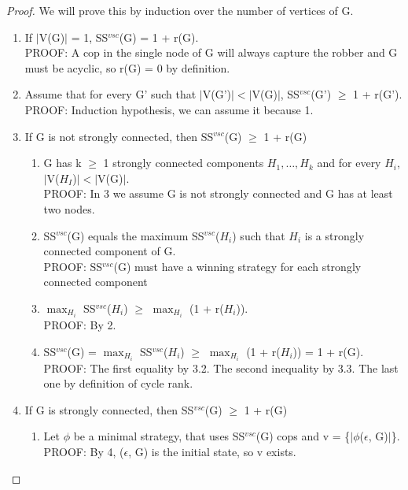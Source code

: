 \begin{proof}
We will prove this by induction over the number of vertices of G.
\begin{enumerate}
  \item If $|$V(G)$|$ = 1, SS$^{vsc}$(G) = 1 + r(G). \\
  PROOF: A cop in the single node of G will always capture the robber and G must be acyclic, so r(G) = 0 by definition.
  \item Assume that for every G' such that  $|$V(G')$| < |$V(G)$|$, SS$^{vsc}$(G') $\geq$ 1 + r(G'). \\
  PROOF: Induction hypothesis, we can assume it because 1.
  \item If G is not strongly connected, then SS$^{vsc}$(G) $\geq$ 1 + r(G)
  \begin{enumerate}[label*=\arabic*.]
    \item G has k $\geq$ 1 strongly connected components $H_1, \ldots, H_k$ and for every $H_i$, $|$V($H_I$)$| < |$V(G)$|$. \\
    PROOF: In 3 we assume G is not strongly connected and G has at least two nodes.
    
    \item SS$^{vsc}$(G) equals the maximum SS$^{vsc}$($H_i$) such that $H_i$ is a strongly connected component of G. \\
    PROOF: SS$^{vsc}$(G) must have a winning strategy for each strongly connected component
    
    \item $\max_{H_i}$ SS$^{vsc}$($H_i$) $\geq$  $\max_{H_i}$ (1 + r($H_i$)). \\
    PROOF: By 2.
    
    \item SS$^{vsc}$(G) = $\max_{H_i}$ SS$^{vsc}$($H_i$) $\geq$  $\max_{H_i}$ (1 + r($H_i$)) = 1 + r(G). \\
    PROOF: The first equality by 3.2. The second inequality by 3.3. The last one by definition of cycle rank.
  \end{enumerate}
  \item If G is strongly connected, then SS$^{vsc}$(G) $\geq$ 1 + r(G) 
  \begin{enumerate}[label*=\arabic*.]
    \item Let $\phi$ be a minimal strategy, that uses SS$^{vsc}$(G) cops and v = \{$|\phi$($\epsilon$, G)$|$\}. \\
    PROOF: By 4, ($\epsilon$, G) is the initial state, so v exists.
    

\end{enumerate}
\end{enumerate}
\end{proof}
